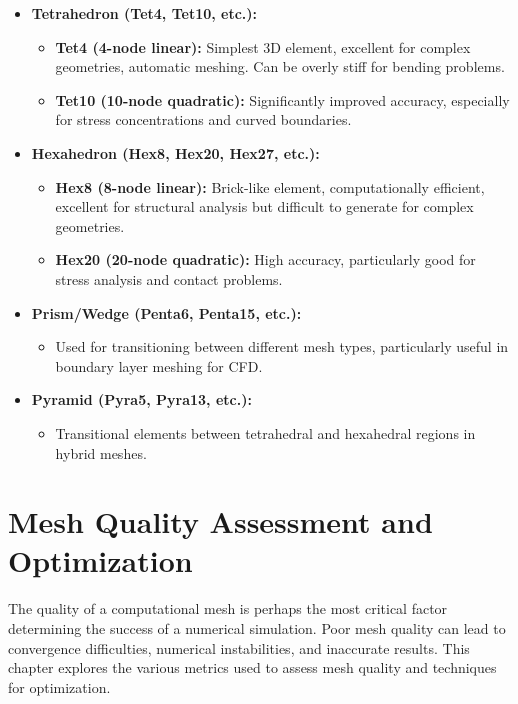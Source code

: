 \documentclass{book}
\begin{document}
\begin{itemize}[leftmargin=*,label=\textbullet]
\begin{itemize}[leftmargin=*,label=\textbullet]
    \item \textbf{Tetrahedron (Tet4, Tet10, etc.):}
    \begin{itemize}[leftmargin=*,label=$\circ$]
        \item \textbf{Tet4 (4-node linear):} Simplest 3D element, excellent for complex geometries, automatic meshing. Can be overly stiff for bending problems.
        \item \textbf{Tet10 (10-node quadratic):} Significantly improved accuracy, especially for stress concentrations and curved boundaries.
    \end{itemize}
    \item \textbf{Hexahedron (Hex8, Hex20, Hex27, etc.):}
    \begin{itemize}[leftmargin=*,label=$\circ$]
        \item \textbf{Hex8 (8-node linear):} Brick-like element, computationally efficient, excellent for structural analysis but difficult to generate for complex geometries.
        \item \textbf{Hex20 (20-node quadratic):} High accuracy, particularly good for stress analysis and contact problems.
    \end{itemize}
    \item \textbf{Prism/Wedge (Penta6, Penta15, etc.):}
    \begin{itemize}[leftmargin=*,label=$\circ$]
        \item Used for transitioning between different mesh types, particularly useful in boundary layer meshing for CFD.
    \end{itemize}
    \item \textbf{Pyramid (Pyra5, Pyra13, etc.):}
    \begin{itemize}[leftmargin=*,label=$\circ$]
        \item Transitional elements between tetrahedral and hexahedral regions in hybrid meshes.
    \end{itemize}
\end{itemize}

\chapter{Mesh Quality Assessment and Optimization}

The quality of a computational mesh is perhaps the most critical factor determining the success of a numerical simulation. Poor mesh quality can lead to convergence difficulties, numerical instabilities, and inaccurate results. This chapter explores the various metrics used to assess mesh quality and techniques for optimization.


\end{itemize}
\end{document}
